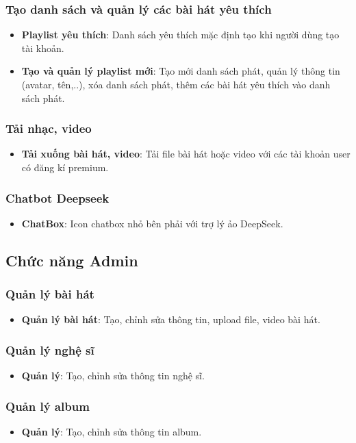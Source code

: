 \documentclass[a4paper,12pt]{article}
\begin{document}
\subsubsection{Tạo danh sách và quản lý các bài hát yêu thích}
\begin{itemize}
\item \textbf{Playlist yêu thích}: Danh sách yêu thích mặc định tạo khi người dùng tạo tài khoản.
\item \textbf{Tạo và quản lý playlist mới}: Tạo mới danh sách phát, quản lý thông tin (avatar, tên,..), xóa danh sách phát, thêm các bài hát yêu thích vào danh sách phát.
\end{itemize}
\subsubsection{Tải nhạc, video}
\begin{itemize}
    \item \textbf{Tải xuống bài hát, video}: Tải file bài hát hoặc video với các tài khoản user có đăng kí premium.
\end{itemize}
\subsubsection{Chatbot Deepseek}
\begin{itemize}
    \item  \textbf{ChatBox}: Icon chatbox nhỏ bên phải với trợ lý ảo DeepSeek.
\end{itemize}
\subsection{Chức năng Admin}
\subsubsection{Quản lý bài hát}
\begin{itemize}
    \item \textbf{Quản lý bài hát}: Tạo, chỉnh sửa thông tin, upload file, video bài hát.
\end{itemize}
\subsubsection{Quản lý nghệ sĩ}
\begin{itemize}
    \item \textbf{Quản lý}: Tạo, chỉnh sửa thông tin nghệ sĩ.
\end{itemize}
\subsubsection{Quản lý album}
\begin{itemize}
    \item \textbf{Quản lý}: Tạo, chỉnh sửa thông tin album.
\end{itemize}
\end{document}
